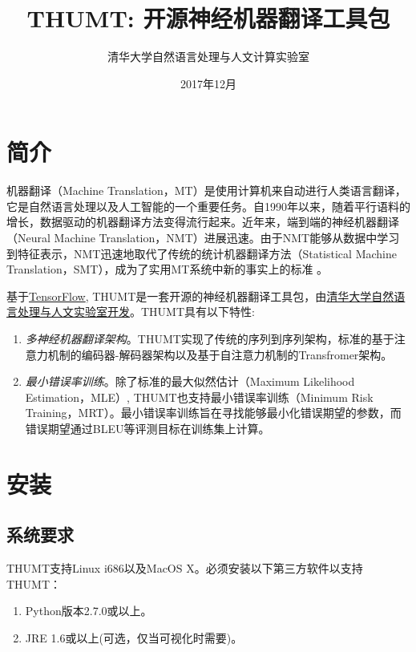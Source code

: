 \documentclass{article}
\title{THUMT: 开源神经机器翻译工具包}
\author{清华大学自然语言处理与人文计算实验室}
\date{2017年12月}
\begin{document}
\maketitle

\section{简介}
机器翻译（Machine Translation，MT）是使用计算机来自动进行人类语言翻译，它是自然语言处理以及人工智能的一个重要任务。自1990年以来，随着平行语料的增长，数据驱动的机器翻译方法变得流行起来。近年来，端到端的神经机器翻译（Neural Machine Translation，NMT）\citep{Sutskever:14,Bahdanau:15}进展迅速。由于NMT能够从数据中学习到特征表示，NMT迅速地取代了传统的统计机器翻译方法（Statistical Machine Translation，SMT）\citep{Brown:93,Koehn:03,Chiang:05}，成为了实用MT系统中新的事实上的标准 \citep{Wu:16}。

基于\href{http://deeplearning.net/software/theano/)}{TensorFlow}, THUMT是一套开源的神经机器翻译工具包，由\href{http://nlp.csai.tsinghua.edu.cn/site2/index.php?lang=zh}{清华大学自然语言处理与人文实验室开发}。THUMT具有以下特性:

\begin{enumerate}
\item {\em 多神经机器翻译架构}。THUMT实现了传统的序列到序列架构\citep{Sutskever:14}，标准的基于注意力机制的编码器-解码器架构\citep{Bahdanau:15}以及基于自注意力机制的Transfromer架构\citep{vaswani2017attention}。
\item {\em 最小错误率训练}。除了标准的最大似然估计（Maximum Likelihood Estimation，MLE）, THUMT也支持最小错误率训练（Minimum Risk Training，MRT）\citep{Shen:16}。最小错误率训练旨在寻找能够最小化错误期望的参数，而错误期望通过BLEU\citep{Papineni:02}等评测目标在训练集上计算。
 \end{enumerate}

\section{安装}

\subsection{系统要求}
THUMT支持Linux i686以及MacOS X。必须安装以下第三方软件以支持THUMT：
\begin{enumerate}
\item Python版本2.7.0或以上。
\item JRE 1.6或以上(可选，仅当可视化时需要)。
\end{enumerate}
\end{document}
